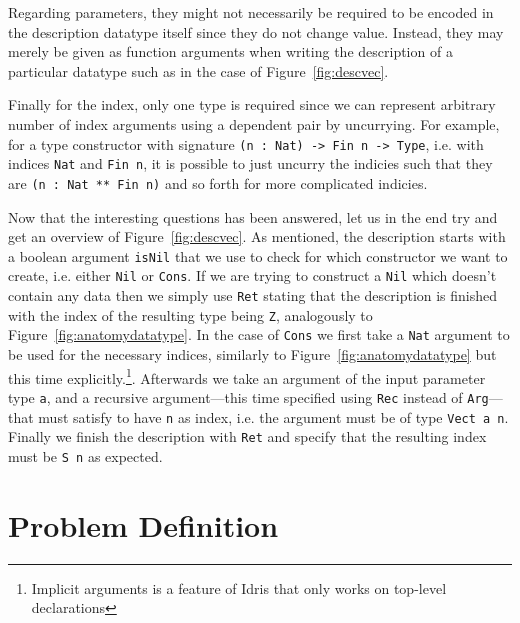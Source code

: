 \documentclass{ituthesis}
\begin{document}
Regarding parameters, they might not necessarily be required to be encoded in the description datatype itself since they do not change value.
Instead, they may merely be given as function arguments when writing the description of a particular datatype such as in the case of Figure~\ref{fig:descvec}.

Finally for the index, only one type is required since we can represent arbitrary number of index arguments using a dependent pair by uncurrying. For example, for a type constructor with signature
\texttt{(n : Nat) -> Fin n -> Type}, i.e. with indices \texttt{Nat} and \texttt{Fin n}, it is possible to just uncurry the indicies such that they are \texttt{(n : Nat ** Fin n)} and so forth for more complicated indicies.

Now that the interesting questions has been answered, let us in the end try and get an overview of Figure~\ref{fig:descvec}. As mentioned, the description starts with a boolean argument \texttt{isNil} that we use to check for which constructor
we want to create, i.e. either \texttt{Nil} or \texttt{Cons}. If we are trying to construct a \texttt{Nil} which doesn't contain any data then we simply use \texttt{Ret} stating that the description is finished with the index of the resulting type being \texttt{Z}, analogously to Figure~\ref{fig:anatomydatatype}.
In the case of \texttt{Cons} we first take a \texttt{Nat} argument to be used for the necessary indices, similarly to Figure~\ref{fig:anatomydatatype} but this time explicitly.\footnote{Implicit arguments is a feature of Idris that only works on top-level declarations}. Afterwards we take an argument of the input parameter type \texttt{a}, and a recursive argument---this time specified using \texttt{Rec} instead of \texttt{Arg}---that must satisfy to have \texttt{n} as index, i.e. the argument must be of type \texttt{Vect a n}.
Finally we finish the description with \texttt{Ret} and specify that the resulting index must be \texttt{S n} as expected.

\section{Problem Definition}
\label{sec:ProblemDefinition}
\end{document}
